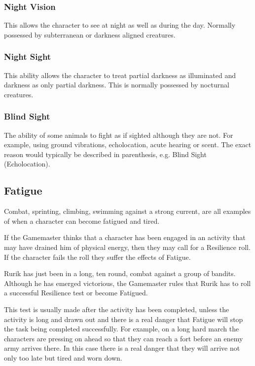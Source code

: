 
\subsubsection{Night Vision}
This allows the character to see at night as well as during the day. Normally possessed by subterranean or darkness aligned creatures.

\subsubsection{Night Sight}
This ability allows the character to treat partial darkness as illuminated and darkness as only partial darkness. This is normally possessed by nocturnal creatures.

\subsubsection{Blind Sight}
The ability of some animals to fight as if sighted although they are not. For example, using ground vibrations, echolocation, acute hearing or scent. The exact reason would typically be described in parenthesis, e.g. Blind Sight (Echolocation).


\subsection{Fatigue}
Combat, sprinting, climbing, swimming against a strong current, are all examples of when a character can become fatigued and tired.

If the Gamemaster thinks that a character has been engaged in an activity that may have drained him of physical energy, then they may call for a Resilience roll. If the character fails the roll they suffer the effects of Fatigue.

\begin{rpg-examplebox}
Rurik has just been in a long, ten round, combat against a group of bandits. Although he has emerged victorious, the Gamemaster rules that Rurik has to roll a successful Resilience test or become Fatigued.
\end{rpg-examplebox}

This test is usually made after the activity has been completed, unless the activity is long and drawn out and there is a real danger that Fatigue will stop the task being completed successfully. For example, on a long hard march the characters are pressing on ahead so that they can reach a fort before an enemy army arrives there. In this case there is a real danger that they will arrive not only too late but tired and worn down.

